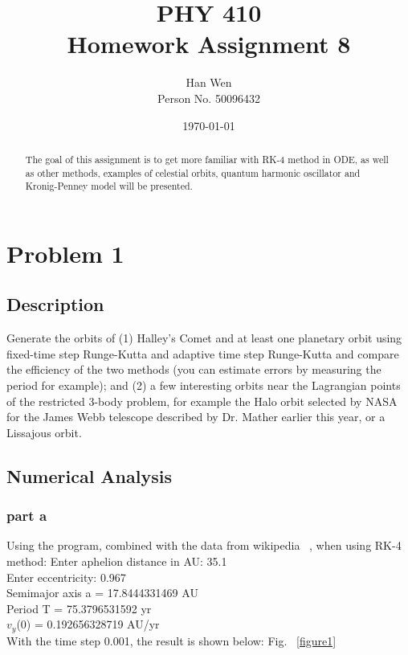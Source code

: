 \documentclass[11pt,letterpaper]{article}
\begin{document}
\title{PHY 410 \\ Homework Assignment 8}
\author{Han Wen \\ \tiny Person No. 50096432}
\date{\today}

\maketitle

\begin{abstract}
The goal of this assignment is to get more familiar with RK-4 method in ODE, as well as other methods, examples of celestial orbits, quantum harmonic oscillator and Kronig-Penney model will be presented.  


\end{abstract}

\tableofcontents

\newpage
\section{Problem 1}

\subsection{Description}

Generate the orbits of (1) Halley's Comet and at least one planetary orbit using fixed-time step Runge-Kutta and adaptive time step Runge-Kutta and compare the efficiency of the two methods (you can estimate errors by measuring the period for example); and (2) a few interesting orbits near the Lagrangian points of the restricted 3-body problem, for example the Halo orbit selected by NASA for the James Webb telescope described by Dr. Mather earlier this year, or a Lissajous orbit.

\subsection{Numerical Analysis}

\subsubsection{part a}
Using the program, combined with the data from wikipedia ~\cite{Halley}, when using RK-4 method:
 Enter aphelion distance in AU: 35.1\\
 Enter eccentricity: 0.967\\
 Semimajor axis a =  17.8444331469  AU\\
 Period T =  75.3796531592  yr\\
 $v_y$(0) =  0.192656328719  AU/yr\\
 With the time step 0.001, the result is shown below: Fig. ~\ref{figure1}
\end{document}
